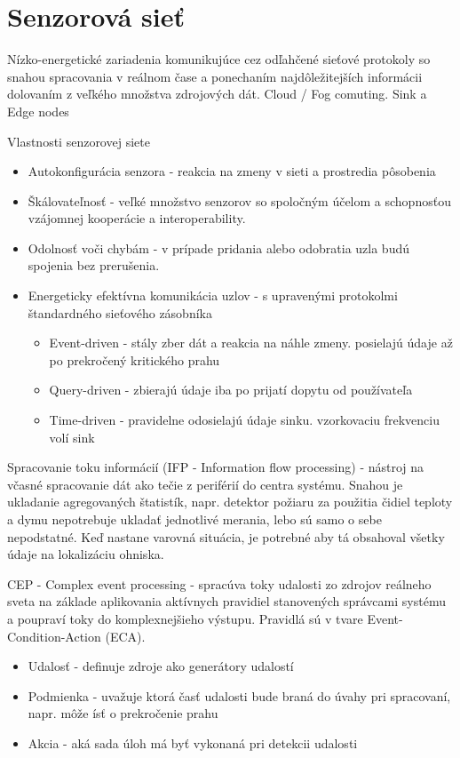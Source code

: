 \section{Senzorová sieť}
Nízko-energetické zariadenia komunikujúce cez odľahčené sieťové protokoly so snahou spracovania v reálnom čase a ponechaním najdôležitejších informácii dolovaním z veľkého množstva zdrojových dát. Cloud / Fog comuting. Sink a Edge nodes

Vlastnosti senzorovej siete
\begin{itemize}
\itemsep0em
\item Autokonfigurácia senzora - reakcia na zmeny v sieti a prostredia pôsobenia
\item Škálovateľnosť - veľké množstvo senzorov so spoločným účelom a schopnosťou vzájomnej kooperácie a interoperability.
\item Odolnosť voči chybám - v prípade pridania alebo odobratia uzla budú spojenia bez prerušenia.
\item Energeticky efektívna komunikácia uzlov - s upravenými protokolmi štandardného sieťového zásobníka
\begin{itemize}
\itemsep0em
\item Event-driven - stály zber dát a reakcia na náhle zmeny. posielajú údaje až po prekročený kritického prahu
\item Query-driven - zbierajú údaje iba po prijatí dopytu od používateľa
\item Time-driven - pravidelne odosielajú údaje sinku. vzorkovaciu frekvenciu volí sink
\end{itemize}
\end{itemize}
\cite{wsn-overview}

Spracovanie toku informácií (IFP - Information flow processing) - nástroj na včasné spracovanie dát ako tečie z periférií do centra systému. Snahou je ukladanie agregovaných štatistík, napr. detektor požiaru za použitia čidiel teploty a dymu nepotrebuje ukladať jednotlivé merania, lebo sú samo o sebe nepodstatné. Keď nastane varovná situácia, je potrebné aby tá obsahoval všetky údaje na lokalizáciu ohniska.

CEP - Complex event processing - spracúva toky udalosti zo zdrojov reálneho sveta na základe aplikovania aktívnych pravidiel stanovených správcami systému a poupraví toky do komplexnejšieho výstupu. Pravidlá sú v tvare Event-Condition-Action (ECA).
\begin{itemize}
\itemsep0em
\item Udalosť - definuje zdroje ako generátory udalostí
\item Podmienka - uvažuje ktorá časť udalosti bude braná do úvahy pri spracovaní, napr. môže ísť o prekročenie prahu
\item Akcia - aká sada úloh má byť vykonaná pri detekcii udalosti
\end{itemize}

